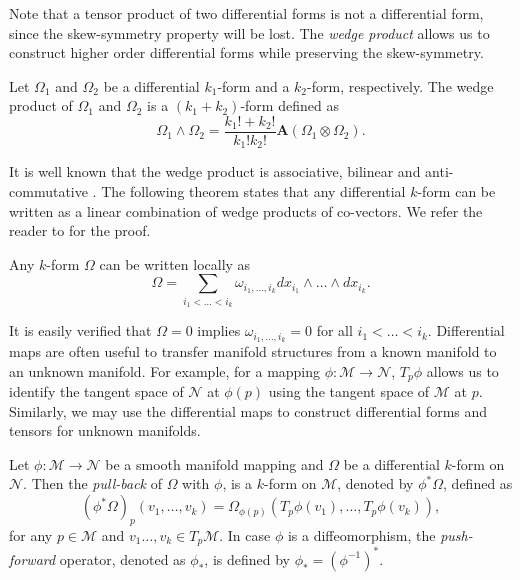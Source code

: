 Note that a tensor product of two differential forms is not a differential form, since the skew-symmetry property will be lost. The \emph{wedge product} allows us to construct higher order differential forms while preserving the skew-symmetry. 
\begin{definition}
Let $\Omega_1$ and $\Omega_2$ be a differential $k_1$-form and a $k_2$-form, respectively. The wedge product of $\Omega_1$ and $\Omega_2$ is a $(k_1+k_2)$-form defined as
\begin{equation} \label{eq:2.8}
	\Omega_1 \wedge \Omega_2 = \frac{k_1! + k_2!}{k_1!k_2!} \mathbf{A}(\Omega_1\otimes \Omega_2).
\end{equation}
\end{definition}
It is well known that the wedge product is associative, bilinear and anti-commutative \cite{marsden2013introduction}. The following theorem states that any differential $k$-form can be written as a linear combination of wedge products of co-vectors. We refer the reader to \cite{abraham1978foundations} for the proof.
\begin{theorem} \label{theorem:2.2}
Any $k$-form $\Omega$ can be written locally as
\begin{equation} \label{eq:2.9}
	\Omega = \sum_{i_1<\dots<i_k} \omega_{i_1,\dots,i_k} dx_{i_1}\wedge\dots\wedge dx_{i_k}.
\end{equation}
\end{theorem}

It is easily verified that $\Omega = 0$ implies $\omega_{i_1,\dots,i_k} = 0$ for all $i_1<\dots<i_k$. Differential maps are often useful to transfer manifold structures from a known manifold to an unknown manifold. For example, for a mapping $\phi:\mathcal M \to \mathcal N$, $T_p\phi$ allows us to identify the tangent space of $\mathcal N$ at $\phi(p)$ using the tangent space of $\mathcal M$ at $p$. Similarly, we may use the differential maps to construct differential forms and tensors for unknown manifolds. 

\begin{definition}
Let $\phi:\mathcal M \to \mathcal N$ be a smooth manifold mapping and $\Omega$ be a differential $k$-form on $\mathcal N$. Then the \emph{pull-back} of $\Omega$ with $\phi$, is a $k$-form on $\mathcal M$, denoted by $\phi^*\Omega$, defined as
\[
	(\phi^*\Omega)_p(v_1,\dots,v_k) = \Omega_{\phi(p)}( T_p\phi(v_1) , \dots , T_p\phi(v_k) ),
\]
for any $p\in \mathcal M$ and $v_1\dots,v_k \in T_p \mathcal M$. In case $\phi$ is a diffeomorphism, the \emph{push-forward} operator, denoted as $\phi_*$, is defined by $\phi_* = (\phi^{-1})^*$.
\end{definition}

